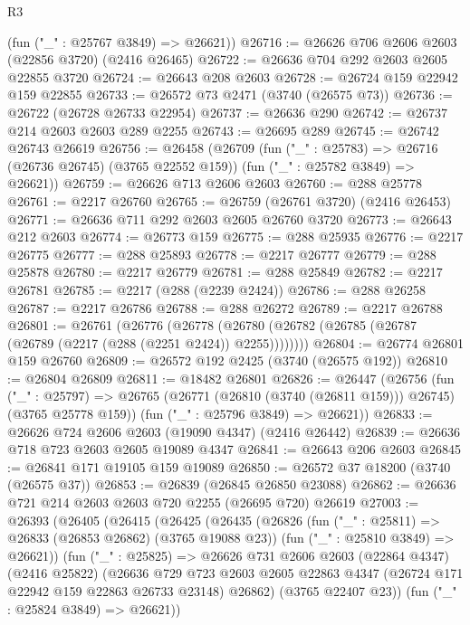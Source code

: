 \begin{lexlean}{R3}
\begin{coremodule}
      (fun ("_" : @25767 @3849) => @26621))
@26716 := @26626 @706 @2606 @2603 (@22856 @3720) (@2416 @26465)
@26722 := @26636 @704 @292 @2603 @2605 @22855 @3720
@26724 := @26643 @208 @2603
@26728 := @26724 @159 @22942 @159 @22855
@26733 := @26572 @73 @2471 (@3740 (@26575 @73))
@26736 := @26722 (@26728 @26733 @22954)
@26737 := @26636 @290
@26742 := @26737 @214 @2603 @2603 @289 @2255
@26743 := @26695 @289
@26745 := @26742 @26743 @26619
@26756 := @26458
    (@26709
      (fun ("_" : @25783) => @26716 (@26736 @26745) (@3765 @22552 @159))
      (fun ("_" : @25782 @3849) => @26621))
@26759 := @26626 @713 @2606 @2603
@26760 := @288 @25778
@26761 := @2217 @26760
@26765 := @26759 (@26761 @3720) (@2416 @26453)
@26771 := @26636 @711 @292 @2603 @2605 @26760 @3720
@26773 := @26643 @212 @2603
@26774 := @26773 @159
@26775 := @288 @25935
@26776 := @2217 @26775
@26777 := @288 @25893
@26778 := @2217 @26777
@26779 := @288 @25878
@26780 := @2217 @26779
@26781 := @288 @25849
@26782 := @2217 @26781
@26785 := @2217 (@288 (@2239 @2424))
@26786 := @288 @26258
@26787 := @2217 @26786
@26788 := @288 @26272
@26789 := @2217 @26788
@26801 := @26761
    (@26776
      (@26778 (@26780 (@26782 (@26785 (@26787 (@26789 (@2217 (@288 (@2251 @2424)) @2255))))))))
@26804 := @26774 @26801 @159 @26760
@26809 := @26572 @192 @2425 (@3740 (@26575 @192))
@26810 := @26804 @26809
@26811 := @18482 @26801
@26826 := @26447
    (@26756
      (fun ("_" : @25797) =>
      @26765 (@26771 (@26810 (@3740 (@26811 @159))) @26745) (@3765 @25778 @159))
      (fun ("_" : @25796 @3849) => @26621))
@26833 := @26626 @724 @2606 @2603 (@19090 @4347) (@2416 @26442)
@26839 := @26636 @718 @723 @2603 @2605 @19089 @4347
@26841 := @26643 @206 @2603
@26845 := @26841 @171 @19105 @159 @19089
@26850 := @26572 @37 @18200 (@3740 (@26575 @37))
@26853 := @26839 (@26845 @26850 @23088)
@26862 := @26636 @721 @214 @2603 @2603 @720 @2255 (@26695 @720) @26619
@27003 := @26393
    (@26405
      (@26415
        (@26425
          (@26435
            (@26826
              (fun ("_" : @25811) => @26833 (@26853 @26862) (@3765 @19088 @23))
              (fun ("_" : @25810 @3849) => @26621))
            (fun ("_" : @25825) =>
            @26626
              @731
              @2606
              @2603
              (@22864 @4347)
              (@2416 @25822)
              (@26636
                @729
                @723
                @2603
                @2605
                @22863
                @4347
                (@26724 @171 @22942 @159 @22863 @26733 @23148)
                @26862)
              (@3765 @22407 @23))
            (fun ("_" : @25824 @3849) => @26621))

\end{coremodule}
\end{lexlean}
